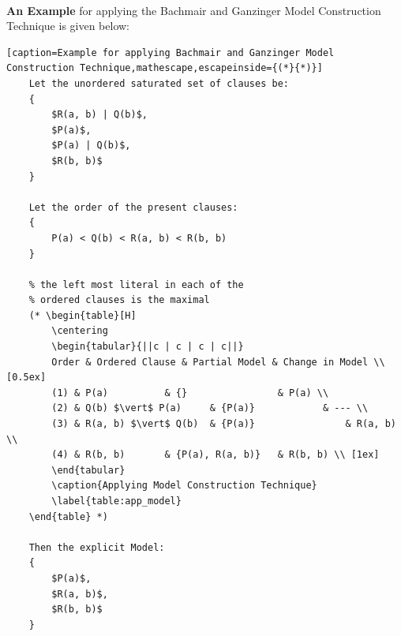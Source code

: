 \begin{algorithm}[H]
\begin{algorithmic}[1]

				\end{algorithmic}
			\end{algorithm}

		
		
		\paragraph{}
		\textbf{An Example} for applying the Bachmair and Ganzinger Model Construction Technique is given below:

			\begin{minipage}{\textwidth}
			\begin{lstlisting}[caption=Example for applying Bachmair and Ganzinger Model Construction Technique,mathescape,escapeinside={(*}{*)}]
	Let the unordered saturated set of clauses be:
	{
		$R(a, b) | Q(b)$,
		$P(a)$,
		$P(a) | Q(b)$,
		$R(b, b)$
	}
	
	Let the order of the present clauses:
	{
		P(a) < Q(b) < R(a, b) < R(b, b)
	}			

	% the left most literal in each of the
	% ordered clauses is the maximal
	(* \begin{table}[H]
		\centering
		\begin{tabular}{||c | c | c | c||}
		Order & Ordered Clause & Partial Model & Change in Model \\ [0.5ex] 
 		(1) & P(a) 			& {} 				& P(a) \\ 
 		(2) & Q(b) $\vert$ P(a)  	& {P(a)} 			& --- \\
 		(3) & R(a, b) $\vert$ Q(b)	& {P(a)}		 		& R(a, b) \\
 		(4) & R(b, b) 		& {P(a), R(a, b)} 	& R(b, b) \\ [1ex]
		\end{tabular}
		\caption{Applying Model Construction Technique}
		\label{table:app_model}
	\end{table} *)
		
	Then the explicit Model:
	{
		$P(a)$,
		$R(a, b)$,
		$R(b, b)$	
	}		
			\end{lstlisting}
			\end{minipage}
		
